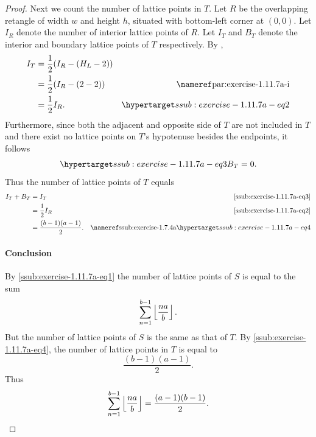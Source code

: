 \documentclass{report}
\begin{document}
\begin{proof}
      Next we count the number of lattice points in $T$.
      Let $R$ be the overlapping retangle of width $w$ and height $h$, situated
        with bottom-left corner at $(0, 0)$.
      Let $I_R$ denote the number of interior lattice points of $R$.
      Let $I_T$ and $B_T$ denote the interior and boundary lattice points of $T$
        respectively.
      By ,
        \begin{align}
          I_T
            & = \frac{1}{2}(I_R - (H_L - 2)) \nonumber \\
            & = \frac{1}{2}(I_R - (2 - 2))
              & \textref{par:exercise-1.11.7a-i} \nonumber \\
            & = \frac{1}{2}I_R. & \hyperlabel{ssub:exercise-1.11.7a-eq2}
        \end{align}
      Furthermore, since both the adjacent and opposite side of $T$ are not
        included in $T$ and there exist no lattice points on $T$'s hypotenuse
        besides the endpoints, it follows
        \begin{equation}
          \hyperlabel{ssub:exercise-1.11.7a-eq3}
          B_T = 0.
        \end{equation}
      Thus the number of lattice points of $T$ equals
        \begin{align}
          I_T + B_T
            & = I_T & \eqref{ssub:exercise-1.11.7a-eq3} \nonumber \\
            & = \frac{1}{2}I_R & \eqref{ssub:exercise-1.11.7a-eq2} \nonumber \\
            & = \frac{(b - 1)(a - 1)}{2}.
              & \textref{ssub:exercise-1.7.4a}
                \hyperlabel{ssub:exercise-1.11.7a-eq4}
        \end{align}

    \paragraph{Conclusion}%

      By \eqref{ssub:exercise-1.11.7a-eq1} the number of lattice points of $S$
        is equal to the sum $$\sum_{n=1}^{b-1} \left\lfloor\frac{na}{b}\right\rfloor.$$
      But the number of lattice points of $S$ is the same as that of $T$.
      By \eqref{ssub:exercise-1.11.7a-eq4}, the number of lattice points in $T$
        is equal to $$\frac{(b - 1)(a - 1)}{2}.$$
      Thus $$\sum_{n=1}^{b-1} \left\lfloor\frac{na}{b}\right\rfloor = \frac{(a - 1)(b - 1)}{2}.$$

  \end{proof}
\end{document}
